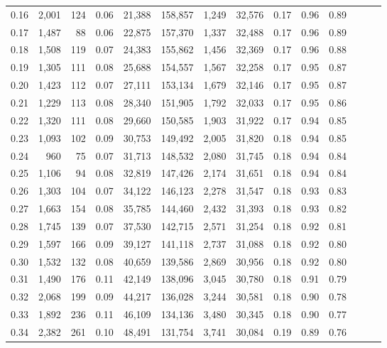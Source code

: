 \begin{tabular}{rrrrrrrrrrrrrr}
0.16 &  2,001 &  124 &  0.06 &   21,388 &  158,857 &   1,249 &  32,576 &  0.17 &  0.96 &      0.89 \\
0.17 &  1,487 &   88 &  0.06 &   22,875 &  157,370 &   1,337 &  32,488 &  0.17 &  0.96 &      0.89 \\
0.18 &  1,508 &  119 &  0.07 &   24,383 &  155,862 &   1,456 &  32,369 &  0.17 &  0.96 &      0.88 \\
0.19 &  1,305 &  111 &  0.08 &   25,688 &  154,557 &   1,567 &  32,258 &  0.17 &  0.95 &      0.87 \\
0.20 &  1,423 &  112 &  0.07 &   27,111 &  153,134 &   1,679 &  32,146 &  0.17 &  0.95 &      0.87 \\
0.21 &  1,229 &  113 &  0.08 &   28,340 &  151,905 &   1,792 &  32,033 &  0.17 &  0.95 &      0.86 \\
0.22 &  1,320 &  111 &  0.08 &   29,660 &  150,585 &   1,903 &  31,922 &  0.17 &  0.94 &      0.85 \\
0.23 &  1,093 &  102 &  0.09 &   30,753 &  149,492 &   2,005 &  31,820 &  0.18 &  0.94 &      0.85 \\
0.24 &    960 &   75 &  0.07 &   31,713 &  148,532 &   2,080 &  31,745 &  0.18 &  0.94 &      0.84 \\
0.25 &  1,106 &   94 &  0.08 &   32,819 &  147,426 &   2,174 &  31,651 &  0.18 &  0.94 &      0.84 \\
0.26 &  1,303 &  104 &  0.07 &   34,122 &  146,123 &   2,278 &  31,547 &  0.18 &  0.93 &      0.83 \\
0.27 &  1,663 &  154 &  0.08 &   35,785 &  144,460 &   2,432 &  31,393 &  0.18 &  0.93 &      0.82 \\
0.28 &  1,745 &  139 &  0.07 &   37,530 &  142,715 &   2,571 &  31,254 &  0.18 &  0.92 &      0.81 \\
0.29 &  1,597 &  166 &  0.09 &   39,127 &  141,118 &   2,737 &  31,088 &  0.18 &  0.92 &      0.80 \\
0.30 &  1,532 &  132 &  0.08 &   40,659 &  139,586 &   2,869 &  30,956 &  0.18 &  0.92 &      0.80 \\
0.31 &  1,490 &  176 &  0.11 &   42,149 &  138,096 &   3,045 &  30,780 &  0.18 &  0.91 &      0.79 \\
0.32 &  2,068 &  199 &  0.09 &   44,217 &  136,028 &   3,244 &  30,581 &  0.18 &  0.90 &      0.78 \\
0.33 &  1,892 &  236 &  0.11 &   46,109 &  134,136 &   3,480 &  30,345 &  0.18 &  0.90 &      0.77 \\
0.34 &  2,382 &  261 &  0.10 &   48,491 &  131,754 &   3,741 &  30,084 &  0.19 &  0.89 &      0.76 \\

\end{tabular}
